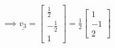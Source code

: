 \documentclass[11pt, a4paper, norsk]{NTNUoving}
\begin{document}
\begin{oppgave}
\begin{punkt}
\begin{align*}
                \\
                &\implies \underline{v_3} = \begin{bmatrix}
                    \frac{1}{2}\\
                    -\frac{1}{2}\\
                    1
                \end{bmatrix} = \frac{1}{2} \begin{bmatrix}
                    1 \\
                    -1 \\
                    2
                \end{bmatrix}
            \end{align*}
        \end{punkt}
    \end{oppgave}
\end{document}
